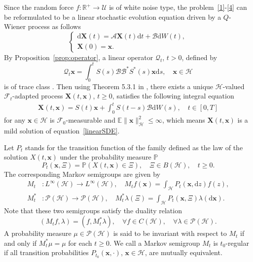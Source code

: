 \documentclass[10pt]{elsarticle}
\begin{document}
Since the random force $f: \mathbb{R}^{+}\rightarrow\mathcal{U}$ is of white noise type, the problem~\eqref{1}-\eqref{4} can be reformulated to be a linear stochastic evolution equation driven by a $Q$-Wiener process as follows 
\begin{equation} \label{linearSDE}
\left
    \{
        \begin{array}{ll}
            \mathrm{d}\mathbf{X}(t)=\mathcal{A}\mathbf{X}(t)\mathrm{d}t+ \mathcal{B}\mathrm{d}W(t),\\
            \mathbf{X}(0)=\mathbf{x}.  
        \end{array}
\right.
\end{equation}
By Proposition~\ref{prop:operator}, a linear operator $\mathcal{Q}_t$, $t > 0$, defined by
\[
	\mathcal{Q}_{t}\mathbf{x}=\int_{0}^{t}S(s)\mathcal{B}\mathcal{B}^{\ast}S^{\ast}(s)\mathbf{x} \mathrm{d}s, \quad \mathbf{x}\in\mathcal{H}
\]
is of trace class .
Then using Theorem 5.3.1 in \cite{PratoZabczyk}, there exists a unique $\mathcal{H}$-valued $\mathcal{F}_{t}$-adapted process $\mathbf{X}(t, \mathbf{x})$, $t\geq 0$, satisfies the following integral equation  
\begin{eqnarray*}
	\mathbf{X}(t, \mathbf{x}) =S(t)\mathbf{x} +\int_{0}^{t}S(t-s)\mathcal{B}\mathrm{d}W(s), \quad t\in [0, T]
\end{eqnarray*}
for any $\mathbf{x} \in \mathcal{H}$ is $\mathcal{F}_0$-measurable and $\mathbb{E}\|\mathbf{x}\|_{\mathcal{H}}^2\leq \infty$, which means $\mathbf{X}(t, \mathbf{x})$ is a mild solution of equation~\eqref{linearSDE}.

Let $P_t$ stands for the transition function of the family defined as the law of the solution $X(t, \mathbf{x})$ under the probability measure $\mathbb{P}$
\[
	P_t(\mathbf{x}, \Xi)=\mathbb{P}(X(t, \mathbf{x})\in \Xi), \quad \Xi\in B(\mathcal{H}), \quad t\geqslant 0.	
\]
The corresponding Markov semigroups are given by
\begin{equation*}
 \begin{aligned}
 	M_{t}&:  L^{\infty}(\mathcal{H})\rightarrow L^{\infty}(\mathcal{H}), \quad M_{t}f(\mathbf{x})=\int_{\mathcal{H}}P_{t}(\mathbf{x}, \mathrm{d}z)f(z),\\
	M^{\ast}_{t}&:  \mathcal{P}(\mathcal{H})\rightarrow \mathcal{P}(\mathcal{H}), \quad M^{\ast}_{t}\lambda(\Xi)=\int_{\mathcal{H}}P_{t}(\mathbf{x}, \Xi)\lambda(\mathrm{d}\mathbf{x}).
\end{aligned}
\end{equation*}
Note that these two semigroups satisfy the duality relation 
\[
(M_{t}f, \lambda)=(f, M_{t}^{\ast}\lambda), \quad \forall f\in C(\mathcal{H}), \quad \forall\lambda\in \mathcal{P}(\mathcal{H}). 
\]
A probability measure $\mu\in\mathcal{P}(\mathcal{H})$ is said to be invariant with respect to $M_{t}$ if and only if $M^{\ast}_{t}\mu = \mu$ for each $t\geqslant0$. We call a Markov semigroup $M_{t}$ is $t_0$-regular if all transition probabilities $P_{t_0}(\mathbf{x}, \cdot)$, $\mathbf{x}\in\mathcal{H}$, are mutually equivalent. 
\end{document}

